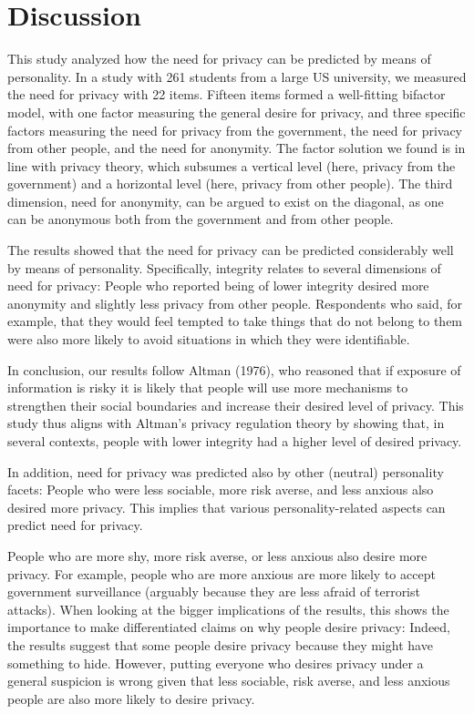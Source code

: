 \documentclass[man,floatsintext]{apa6}
\theoremstyle{definition}
\theoremstyle{definition}
\theoremstyle{definition}
\theoremstyle{remark}
\begin{document}
\hypertarget{discussion}{%
\section{Discussion}\label{discussion}}

This study analyzed how the need for privacy can be predicted by means
of personality. In a study with 261 students from a large US university,
we measured the need for privacy with 22 items. Fifteen items formed a
well-fitting bifactor model, with one factor measuring the general
desire for privacy, and three specific factors measuring the need for
privacy from the government, the need for privacy from other people, and
the need for anonymity. The factor solution we found is in line with
privacy theory, which subsumes a vertical level (here, privacy from the
government) and a horizontal level (here, privacy from other people).
The third dimension, need for anonymity, can be argued to exist on the
diagonal, as one can be anonymous both from the government and from
other people.

The results showed that the need for privacy can be predicted
considerably well by means of personality. Specifically, integrity
relates to several dimensions of need for privacy: People who reported
being of lower integrity desired more anonymity and slightly less
privacy from other people. Respondents who said, for example, that they
would feel tempted to take things that do not belong to them were also
more likely to avoid situations in which they were identifiable.

In conclusion, our results follow Altman (1976), who reasoned that if
exposure of information is risky it is likely that people will use more
mechanisms to strengthen their social boundaries and increase their
desired level of privacy. This study thus aligns with Altman's privacy
regulation theory by showing that, in several contexts, people with
lower integrity had a higher level of desired privacy.

In addition, need for privacy was predicted also by other (neutral)
personality facets: People who were less sociable, more risk averse, and
less anxious also desired more privacy. This implies that various
personality-related aspects can predict need for privacy.

People who are more shy, more risk averse, or less anxious also desire
more privacy. For example, people who are more anxious are more likely
to accept government surveillance (arguably because they are less afraid
of terrorist attacks). When looking at the bigger implications of the
results, this shows the importance to make differentiated claims on why
people desire privacy: Indeed, the results suggest that some people
desire privacy because they might have something to hide. However,
putting everyone who desires privacy under a general suspicion is wrong
given that less sociable, risk averse, and less anxious people are also
more likely to desire privacy.
\end{document}
